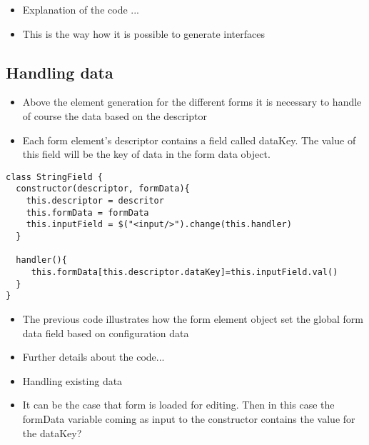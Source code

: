 
\begin{itemize}
	\item Explanation of the code ...
	\item This is the way how it is possible to generate interfaces
\end{itemize}


\subsection{Handling data}

\begin{itemize}
	\item Above the element generation for the different forms it is necessary to handle of course the data based on the descriptor
	\item Each form element's descriptor contains a field called dataKey. The value of this field will be the key of data in the form data object.
\end{itemize}


\begin{lstlisting}[basicstyle=\footnotesize, frame=single, caption={Data saving}, captionpos=b]
class StringField {
  constructor(descriptor, formData){
    this.descriptor = descritor
    this.formData = formData
    this.inputField = $("<input/>").change(this.handler)
  }
  
  handler(){
     this.formData[this.descriptor.dataKey]=this.inputField.val() 
  }			
}
\end{lstlisting}



\begin{itemize}
	\item The previous code illustrates how the form element object set the global form data field based on configuration data
	\item Further details about the code...
\end{itemize}

\begin{itemize}
	\item Handling existing data
	\item It can be the case that form is loaded for editing. Then in this case the formData variable coming as input to the constructor contains the value for the dataKey? 
\end{itemize}

